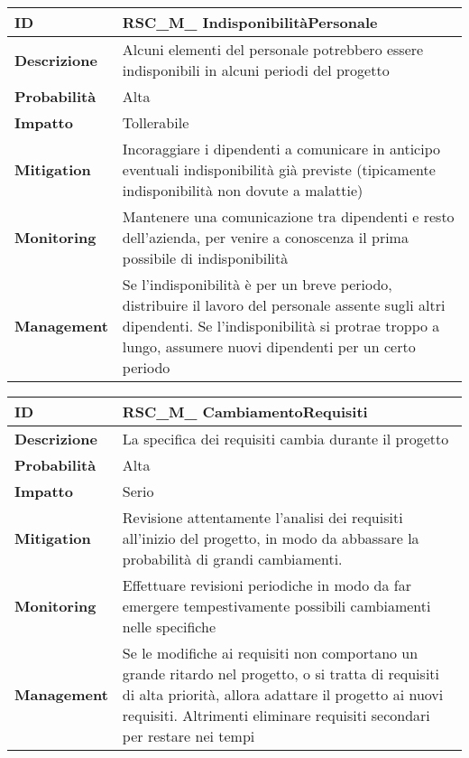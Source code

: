 \begin{tabular}{|p{2.2cm}|p{9.6cm}| }
 	\hline
	\textbf{ID} & RSC\_M\_ IndisponibilitàPersonale\\ [0.5ex] 
	\hline
	\textbf{Descrizione} & Alcuni elementi del personale potrebbero essere indisponibili in alcuni periodi del progetto\\ 
	\hline
	\textbf{Probabilità} &  Alta \\ 
	\hline
	\textbf{Impatto} &  Tollerabile \\ 
	\hline
	\textbf{Mitigation} & Incoraggiare i dipendenti a comunicare in anticipo eventuali indisponibilità già previste (tipicamente indisponibilità non dovute a malattie) \\ 
	\hline
	\textbf{Monitoring} & Mantenere una comunicazione tra dipendenti e resto dell'azienda, per venire a conoscenza il prima possibile di indisponibilità\\ 
	\hline
	\textbf{Management} & Se l'indisponibilità è per un breve periodo, distribuire il lavoro del personale assente sugli altri dipendenti. Se l'indisponibilità si protrae troppo a lungo, assumere nuovi dipendenti per un certo periodo\\ 
	\hline
\end{tabular}

\begin{tabular}{|p{2.2cm}|p{9.6cm}| }
 	\hline
	\textbf{ID} & RSC\_M\_ CambiamentoRequisiti\\ [0.5ex] 
	\hline
	\textbf{Descrizione} & La specifica dei requisiti cambia durante il progetto \\ 
	\hline
	\textbf{Probabilità} &  Alta \\ 
	\hline
	\textbf{Impatto} &  Serio \\ 
	\hline
	\textbf{Mitigation} & Revisione attentamente l'analisi dei requisiti all'inizio del progetto, in modo da abbassare la probabilità di grandi cambiamenti.\\ 
	\hline
	\textbf{Monitoring} & Effettuare revisioni periodiche in modo da far emergere tempestivamente possibili cambiamenti nelle specifiche\\ 
	\hline
	\textbf{Management} & Se le modifiche ai requisiti non comportano un grande ritardo nel progetto, o si tratta di requisiti di alta priorità, allora adattare il progetto ai nuovi requisiti. Altrimenti eliminare requisiti secondari per restare nei tempi \\ 
	\hline
\end{tabular}

